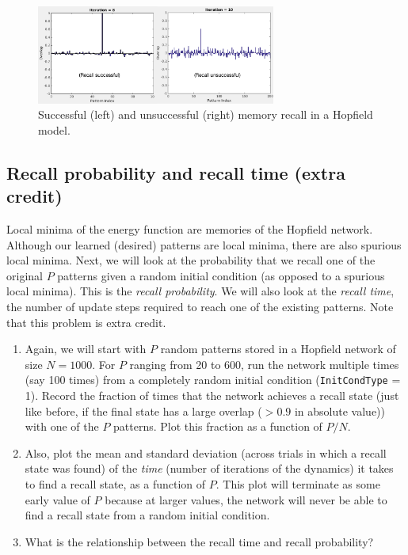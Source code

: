 \documentclass[letterpaper,11pt]{article}
\begin{document}
\begin{figure}[h!]
  \begin{center}
    \includegraphics[width=0.7\textwidth]{recall.png}
    \caption{Successful (left) and unsuccessful (right) memory recall in a Hopfield model.}
    \label{fig:recall}
  \end{center}
\end{figure}

\subsection{Recall probability and recall time (extra credit)}
Local minima of the energy function are memories of the Hopfield network.
Although our learned (desired) patterns are local minima, there are also spurious local minima.
Next, we will look at the probability that we recall one of the original $P$ patterns given a random initial condition (as opposed to a spurious local minima).
This is the \textit{recall probability}.
We will also look at the \textit{recall time}, the number of update steps required to reach one of the existing patterns.
Note that this problem is extra credit.

\begin{enumerate}
  \item Again, we will start with $P$ random patterns stored in a Hopfield network of size $N=1000$. For $P$ ranging from 20 to 600, run the network multiple times (say 100 times) from a completely random initial condition (\texttt{InitCondType} = 1). Record the fraction of times that the network achieves a recall state (just like before, if the final state has a large overlap ($> 0.9$ in absolute value)) with one of the $P$ patterns. Plot this fraction as a function of $P/N$.
  \item Also, plot the mean and standard deviation (across trials in which a recall state was found) of the \textit{time} (number of iterations of the dynamics) it takes to find a recall state, as a function of $P$. This plot will terminate as some early value of $P$ because at larger values, the network will never be able to find a recall state from a random initial condition.
  \item What is the relationship between the recall time and recall probability?
\end{enumerate}



\end{document}
